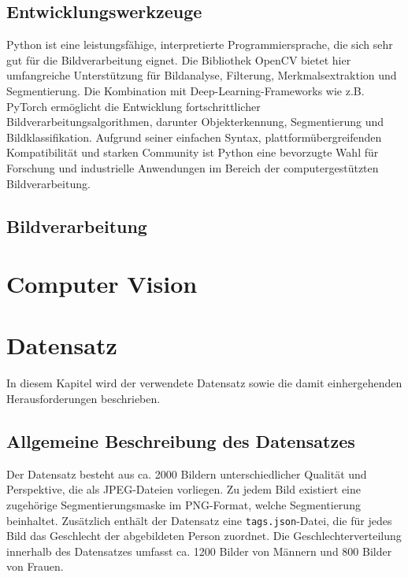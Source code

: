 \documentclass[journal,twoside,web]{ieeecolor}
\begin{document}
\subsection{Entwicklungswerkzeuge}
\label{sec:tools}
Python ist eine leistungsfähige, interpretierte Programmiersprache, die sich sehr gut für die Bildverarbeitung eignet. Die Bibliothek OpenCV bietet hier umfangreiche Unterstützung für Bildanalyse, Filterung, Merkmalsextraktion und Segmentierung. Die Kombination mit Deep-Learning-Frameworks wie z.B. PyTorch ermöglicht die Entwicklung fortschrittlicher Bildverarbeitungsalgorithmen, darunter Objekterkennung, Segmentierung und Bildklassifikation. Aufgrund seiner einfachen Syntax, plattformübergreifenden Kompatibilität und starken Community ist Python eine bevorzugte Wahl für Forschung und industrielle Anwendungen im Bereich der computergestützten Bildverarbeitung.

\subsection{Bildverarbeitung}
\label{sec:image_processing}

\section{Computer Vision}
\label{sec:computer_vision} 

\section{Datensatz} 
\label{sec:dataset}
In diesem Kapitel wird der verwendete Datensatz sowie die damit einhergehenden Herausforderungen beschrieben.

\subsection{Allgemeine Beschreibung des Datensatzes}
\label{sec:dataset_description}
Der Datensatz besteht aus ca. 2000 Bildern unterschiedlicher Qualität und Perspektive, die als JPEG-Dateien vorliegen. Zu jedem Bild existiert eine zugehörige Segmentierungsmaske im PNG-Format, welche Segmentierung beinhaltet. Zusätzlich enthält der Datensatz eine \texttt{tags.json}-Datei, die für jedes Bild das Geschlecht der abgebildeten Person zuordnet. Die Geschlechterverteilung innerhalb des Datensatzes umfasst ca. 1200 Bilder von Männern und 800 Bilder von Frauen.
\end{document}
